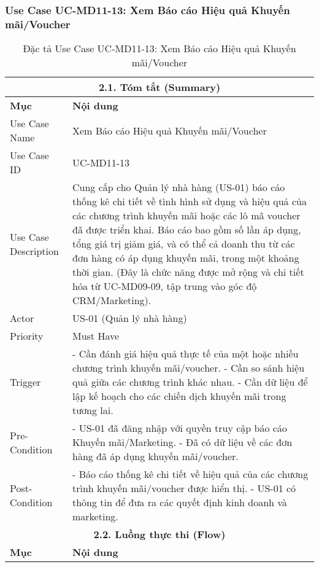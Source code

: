 \subsubsection{Use Case UC-MD11-13: Xem Báo cáo Hiệu quả Khuyến mãi/Voucher}
\begin{longtable}{|m{4cm}|p{11cm}|}
\caption{Đặc tả Use Case UC-MD11-13: Xem Báo cáo Hiệu quả Khuyến mãi/Voucher} \label{tab:uc_md11_13_report_promo_effectiveness} \\
\hline
\multicolumn{2}{|c|}{\textbf{2.1. Tóm tắt (Summary)}} \\
\hline
\textbf{Mục} & \textbf{Nội dung} \\
\hline
\endhead
\midrule
\endfoot
\bottomrule
\endlastfoot
Use Case Name & Xem Báo cáo Hiệu quả Khuyến mãi/Voucher \\
\hline
Use Case ID & UC-MD11-13 \\
\hline
Use Case Description & Cung cấp cho Quản lý nhà hàng (US-01) báo cáo thống kê chi tiết về tình hình sử dụng và hiệu quả của các chương trình khuyến mãi hoặc các lô mã voucher đã được triển khai. Báo cáo bao gồm số lần áp dụng, tổng giá trị giảm giá, và có thể cả doanh thu từ các đơn hàng có áp dụng khuyến mãi, trong một khoảng thời gian. (Đây là chức năng được mở rộng và chi tiết hóa từ UC-MD09-09, tập trung vào góc độ CRM/Marketing). \\
\hline
Actor & US-01 (Quản lý nhà hàng) \\
\hline
Priority & Must Have \\
\hline
Trigger & - Cần đánh giá hiệu quả thực tế của một hoặc nhiều chương trình khuyến mãi/voucher. \newline - Cần so sánh hiệu quả giữa các chương trình khác nhau. \newline - Cần dữ liệu để lập kế hoạch cho các chiến dịch khuyến mãi trong tương lai. \\
\hline
Pre-Condition & - US-01 đã đăng nhập với quyền truy cập báo cáo Khuyến mãi/Marketing. \newline - Đã có dữ liệu về các đơn hàng đã áp dụng khuyến mãi/voucher. \\
\hline
Post-Condition & - Báo cáo thống kê chi tiết về hiệu quả của các chương trình khuyến mãi/voucher được hiển thị. \newline - US-01 có thông tin để đưa ra các quyết định kinh doanh và marketing. \\
\hline
\multicolumn{2}{|c|}{\textbf{2.2. Luồng thực thi (Flow)}} \\
\hline
\textbf{Mục} & \textbf{Nội dung} \\

\end{longtable}
